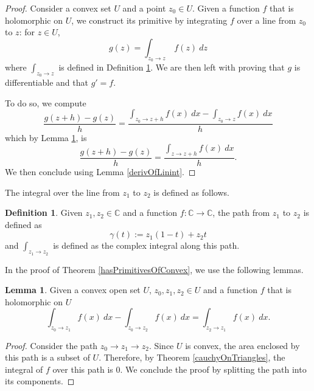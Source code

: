 \documentclass{report}
\theoremstyle{definition}
\newtheorem{definition}{Definition}
\newtheorem{lemma}{Lemma}
\begin{document}
\begin{proof}
  Consider a convex set $U$ and a point $z_0\in U$.
  Given a function $f$ that is holomorphic on $U$, we construct its primitive by integrating $f$ over a line from $z_0$ to $z$: for $z\in U$,
  \begin{equation}
    g(z)=\int_{z_0\to z}\ f(z)\ dz
  \end{equation}
  where $\int_{z_0\to z}$ is defined in Definition \ref{linint}.
  We are then left with proving that $g$ is differentiable and that $g'=f$.

  To do so, we compute
  \begin{equation}
    \frac{g(z+h)-g(z)}h
    =
    \frac{\int_{z_0\to z+h} f(x)\ dx-\int_{z_0\to z} f(x)\ dx}h
  \end{equation}
  which by Lemma \ref{diffOfIntegrals}, is
  \begin{equation}
    \frac{g(z+h)-g(z)}h
    =
    \frac{\int_{z\to z+h} f(x)\ dx}h
    .
  \end{equation}
  We then conclude using Lemma \ref{derivOfLinint}.
\end{proof}

The integral over the line from $z_1$ to $z_2$ is defined as follows.

\begin{definition}
  \label{linint}
  \leanok
  Given $z_1,z_2\in\mathbb C$ and a function $f:\mathbb C\to\mathbb C$, the path from $z_1$ to $z_2$ is defined as
  \begin{equation}
    \gamma(t):=z_1(1-t)+z_2 t
  \end{equation}
  and $\int_{z_1\to z_2}$ is defined as the complex integral along this path.
\end{definition}

In the proof of Theorem \ref{hasPrimitivesOfConvex}, we use the following lemmas.

\begin{lemma}
  \label{diffOfIntegrals}
  \leanok
  Given a convex open set $U$, $z_0,z_1,z_2\in U$ and a function $f$ that is holomorphic on $U$
  \begin{equation}
    \int_{z_0\to z_1} f(x)\ dx
    -
    \int_{z_0\to z_2} f(x)\ dx
    =
    \int_{z_2\to z_1} f(x)\ dx
    .
  \end{equation}
\end{lemma}

\begin{proof}
  Consider the path $z_0\to z_1\to z_2$.
  Since $U$ is convex, the area enclosed by this path is a subset of $U$.
  Therefore, by Theorem \ref{cauchyOnTriangles}, the integral of $f$ over this path is 0.
  We conclude the proof by splitting the path into its components.
\end{proof}
\end{document}
